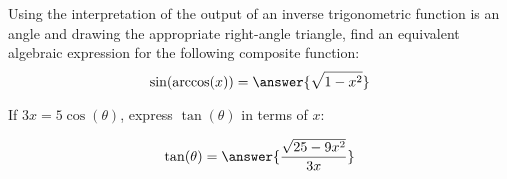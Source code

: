 \documentclass{ximera}
\begin{document}
\begin{problem}
  Using the interpretation of the output of an inverse trigonometric function is an angle and drawing the appropriate right-angle triangle, find an equivalent algebraic expression for the following composite function:
  \[
    \sin(\arccos(x)) = \answer{\sqrt{1-x^2}}
  \]
\end{problem}

\begin{problem}
  If $3x = 5 \cos(\theta)$, express $\tan(\theta)$ in terms of $x$:
  
  \[
    \tan(\theta) = \answer{\frac{\sqrt{25- 9x^2}}{3x}}
  \]
\end{problem}
\end{document}
